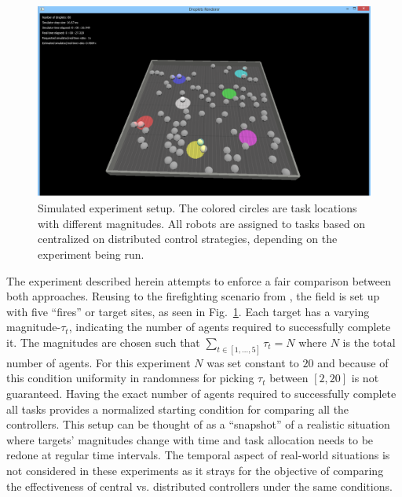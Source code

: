 \documentclass[12pt]{book}
\begin{document}
\begin{figure}[!ht]
\centering\includegraphics[width=.65\textwidth]{../assets/dsim.png}
\centering\caption{Simulated experiment setup. The colored circles are task locations with different magnitudes. All robots are assigned to tasks based on centralized on distributed control strategies, depending on the experiment being run.}\label{fig:expsetup}
\end{figure}

The experiment described herein attempts to enforce a fair comparison between both approaches. Reusing to the firefighting scenario from \cite{Kanakia2014}, the field is set up with five ``fires'' or target sites, as seen in Fig.~\ref{fig:expsetup}. Each target has a varying magnitude-$\tau_t$, indicating the number of agents required to successfully complete it. The magnitudes are chosen such that $\sum_{t \in [1,\ldots,5]}\tau_t = N$ where $N$ is the total number of agents. For this experiment $N$ was set constant to $20$ and because of this condition uniformity in randomness for picking $\tau_t$ between $[2, 20]$ is not guaranteed. Having the exact number of agents required to successfully complete all tasks provides a normalized starting condition for comparing all the controllers. This setup can be thought of as a ``snapshot'' of a realistic situation where targets' magnitudes change with time and task allocation needs to be redone at regular time intervals. The temporal aspect of real-world situations is not considered in these experiments as it strays for the objective of comparing the effectiveness of central vs. distributed controllers under the same conditions.
\end{document}

